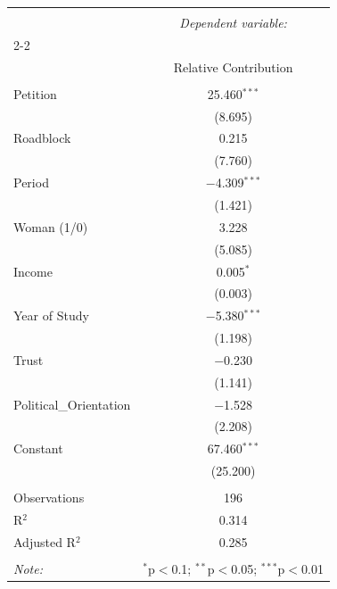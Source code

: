 \begin{tabular}{@{\extracolsep{5pt}}lc} 
\\[-1.8ex]\hline 
\hline \\[-1.8ex] 
 & \multicolumn{1}{c}{\textit{Dependent variable:}} \\ 
\cline{2-2} 
\\[-1.8ex] & Relative Contribution \\ 
\hline \\[-1.8ex] 
 Petition & 25.460$^{***}$ \\ 
  & (8.695) \\ 
  Roadblock & 0.215 \\ 
  & (7.760) \\ 
  Period & $-$4.309$^{***}$ \\ 
  & (1.421) \\ 
  Woman (1/0) & 3.228 \\ 
  & (5.085) \\ 
  Income & 0.005$^{*}$ \\ 
  & (0.003) \\ 
  Year of Study & $-$5.380$^{***}$ \\ 
  & (1.198) \\ 
  Trust & $-$0.230 \\ 
  & (1.141) \\ 
  Political\_Orientation & $-$1.528 \\ 
  & (2.208) \\ 
  Constant & 67.460$^{***}$ \\ 
  & (25.200) \\ 
 \hline \\[-1.8ex] 
Observations & 196 \\ 
R$^{2}$ & 0.314 \\ 
Adjusted R$^{2}$ & 0.285 \\ 
\hline 
\hline \\[-1.8ex] 
\textit{Note:}  & \multicolumn{1}{r}{$^{*}$p$<$0.1; $^{**}$p$<$0.05; $^{***}$p$<$0.01} \\ 
\end{tabular} 